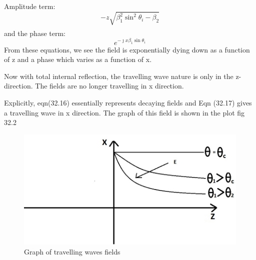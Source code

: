 \begin{enumerate}[(i)]
Amplitude term:
\begin{equation}
-z\sqrt{\beta_1^2\sin^2\theta_i - \beta_2}
\end{equation}
\begin{align*}
\end{align*}
and the phase term:
\begin{equation}
e^{- \jmath x\beta_1\sin\theta_i}
\end{equation}
From these equations, we see the field is exponentially dying down as a function of z and a phase which varies as a function of x.
\end{enumerate}
Now with total internal reflection, the travelling wave nature is only in the z-direction. The fields are no longer travelling in x direction.

Explicitly, eqn(32.16) essentially represents decaying fields and Eqn (32.17) gives a travelling wave in x direction. The graph of this field is shown in the plot fig 32.2
\begin{figure}[h]
\centering
\includegraphics[width=.7\linewidth]{./graphics/fig322}
\caption{Graph of travelling waves fields}
\end{figure}

